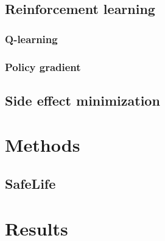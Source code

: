 \documentclass[12pt,A4]{report}
\theoremstyle{definition}
\begin{document}


\section{Reinforcement learning}

\subsection{Q-learning}


\subsection{Policy gradient}


\section{Side effect minimization}






\chapter{Methods}

\section{SafeLife}




\chapter{Results}



\end{document}
